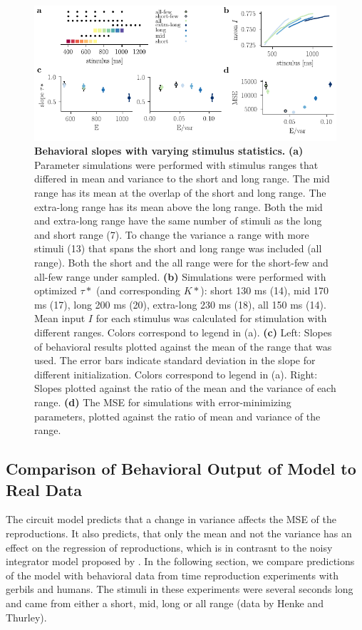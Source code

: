 \documentclass[10pt]{article}
\begin{document}
\begin{figure}[ht]
	\centering
	\includegraphics{figures/ranges_new2.pdf}
	\caption{\textbf{Behavioral slopes with varying stimulus statistics.} 
	\textbf{(a)} Parameter simulations were performed with stimulus ranges that differed in mean and variance to the short and long range. The mid range has its mean at the overlap of the short and long range. The extra-long range has its mean above the long range. Both the mid and extra-long range have the same number of stimuli as the long and short range (7). To change the variance a range with more stimuli (13) that spans the short and long range was included (all range). Both the short and the all range were for the short-few and all-few range under sampled.
	\textbf{(b)} Simulations were performed with optimized $\tau*$ (and corresponding  $K*$): short 130 ms (14), mid 170 ms (17), long 200 ms (20), extra-long 230 ms (18), all 150 ms (14). Mean input $I$ for each stimulus was calculated for stimulation with different ranges. Colors correspond to legend in (a). 
	\textbf{(c)} Left: Slopes of behavioral results plotted against the mean of the range that was used. The error bars indicate standard deviation in the slope for different initialization. Colors correspond to legend in (a).
	Right: Slopes plotted against the ratio of the mean and the variance of each range. 
	\textbf{(d)} The MSE for simulations with error-minimizing parameters, plotted against the ratio of mean and variance of the range.
	}
\label{fig:new_ranges}
\end{figure}

\subsection{Comparison of Behavioral Output of Model to Real Data}
The circuit model predicts that a change in variance affects the MSE of the reproductions.
It also predicts, that only the mean and not the variance has an effect on the regression of reproductions, which is in contrasnt to the noisy integrator model proposed by \cite{Thurley2016}.
In the following section, we compare predictions of the model with behavioral data from time reproduction experiments with gerbils and humans. The stimuli in these experiments were several seconds long and came from either a short, mid, long or all range (data by Henke and Thurley).
\end{document}
